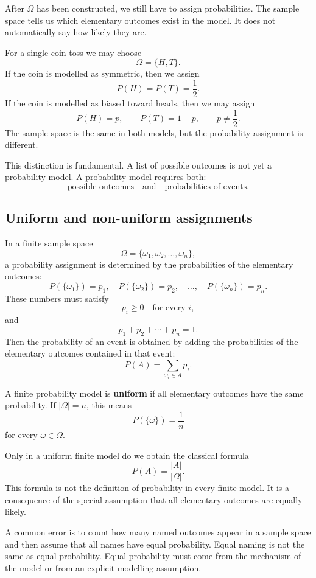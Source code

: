 After \(\Omega\) has been constructed, we still have to assign probabilities.
The sample space tells us which elementary outcomes exist in the model. It does
not automatically say how likely they are.

\begin{examplebox}
For a single coin toss we may choose
\[
\Omega=\{H,T\}.
\]
If the coin is modelled as symmetric, then we assign
\[
P(H)=P(T)=\frac12.
\]
If the coin is modelled as biased toward heads, then we may assign
\[
P(H)=p,\qquad P(T)=1-p,\qquad p\neq \frac12.
\]
The sample space is the same in both models, but the probability assignment is
different.
\end{examplebox}

This distinction is fundamental. A list of possible outcomes is not yet a
probability model. A probability model requires both:
\[
\text{possible outcomes} \quad \text{and} \quad \text{probabilities of events}.
\]

\subsection*{Uniform and non-uniform assignments}

In a finite sample space
\[
\Omega=\{\omega_1,\omega_2,\ldots,\omega_n\},
\]
a probability assignment is determined by the probabilities of the elementary
outcomes:
\[
P(\{\omega_1\})=p_1,\quad P(\{\omega_2\})=p_2,\quad \ldots,\quad
P(\{\omega_n\})=p_n.
\]
These numbers must satisfy
\[
p_i\geq 0\quad\text{for every }i,
\]
and
\[
p_1+p_2+\cdots+p_n=1.
\]
Then the probability of an event is obtained by adding the probabilities of the
elementary outcomes contained in that event:
\[
P(A)=\sum_{\omega_i\in A}p_i.
\]

\begin{definitionbox}
A finite probability model is \textbf{uniform} if all elementary outcomes have
the same probability. If \(|\Omega|=n\), this means
\[
P(\{\omega\})=\frac1n
\]
for every \(\omega\in\Omega\).
\end{definitionbox}

Only in a uniform finite model do we obtain the classical formula
\[
P(A)=\frac{|A|}{|\Omega|}.
\]
This formula is not the definition of probability in every finite model. It is a
consequence of the special assumption that all elementary outcomes are equally
likely.

\begin{remarkbox}
A common error is to count how many named outcomes appear in a sample space and
then assume that all names have equal probability. Equal naming is not the same
as equal probability. Equal probability must come from the mechanism of the
model or from an explicit modelling assumption.
\end{remarkbox}


